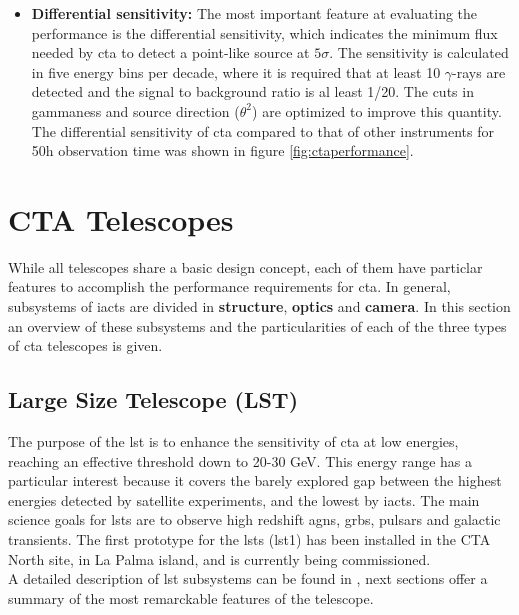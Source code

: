 \documentclass[main.tex]{subfiles}
\begin{document}
\begin{itemize}
\item \textbf{Differential sensitivity:} The most important feature at evaluating the performance is the differential sensitivity, which indicates the minimum flux needed by \gls{cta} to detect a point-like source at $5\sigma$. The sensitivity is calculated in five energy bins per decade, where it is required that at least 10 $\gamma$-rays are detected and the signal to background ratio is al least 1/20. The cuts in gammaness and source direction ($\theta^2$) are optimized to improve this quantity. The differential sensitivity of \gls{cta} compared to that of other instruments for 50h observation time was shown in figure \ref{fig:ctaperformance}.\\
  
\end{itemize}

\section{CTA Telescopes} \label{sec:ctatelescopes}

While all telescopes share a basic design concept, each of them have particlar features to accomplish the performance requirements for \gls{cta}. In general, subsystems of \glspl{iact} are divided in \textbf{structure}, \textbf{optics} and \textbf{camera}. 
In this section an overview of these subsystems and the particularities of each of the three types of \gls{cta} telescopes is given. 

\subsection{Large Size Telescope (LST)}

The purpose of the \gls{lst} is to enhance the sensitivity of \gls{cta} at low energies, reaching an effective threshold down to 20-30 GeV. This energy range has a particular interest because it covers the barely explored gap between the highest energies detected by satellite experiments, and the lowest by \glspl{iact}. The main science goals for \glspl{lst} are to observe high redshift \glspl{agn}, \glspl{grb}, pulsars and galactic transients. The first prototype for the \glspl{lst} (\gls{lst}1) has been installed in the CTA North site, in La Palma island, and is currently being commissioned.\\
A detailed description of \gls{lst} subsystems can be found in \cite{2013LST}, next sections offer a summary of the most remarckable features of the telescope.\\
\end{document}
